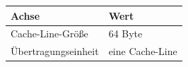 \begin{tabular}{ll}
\toprule
Achse & Wert \\
\midrule
Cache-Line-Größe & 64 Byte \\
Übertragungseinheit & eine Cache-Line \\
\bottomrule
\end{tabular}
